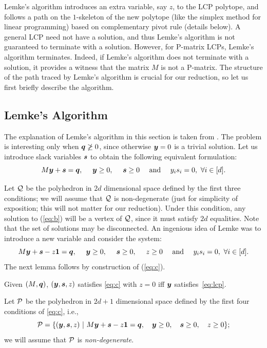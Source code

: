 Lemke's algorithm introduces an extra variable, say $z$, to the LCP polytope,
and follows a path on the $1$-skeleton of the new polytope (like the simplex 
method for linear programming) based
on complementary pivot rule (details below).  A general LCP need not have a
solution, and thus Lemke's algorithm is not guaranteed to terminate with a
solution.  However, for P-matrix LCPs, Lemke's algorithm terminates.  Indeed, if
Lemke's algorithm does not terminate with a solution, it provides a witness that
the matrix $M$ is not a P-matrix.  The structure of the path traced by Lemke's
algorithm is crucial for our reduction, so let us first briefly describe the
algorithm.

\subsection{Lemke's Algorithm}
\label{sec:lemke}

The explanation of Lemke's algorithm in this section is taken from \cite{GMSV}.
The problem is interesting only when $\mbox{\boldmath $q$} \not \geq 0$, since otherwise $\mbox{\boldmath $y$} = 0$ is a trivial solution. Let us introduce
slack variables $\mbox{\boldmath $s$}$ to obtain the following equivalent formulation:
\begin{equation} \label{eq:b} \MM \yy  + \ps = \pq, \ \ \ \  \yy \geq 0, \ \ \ \ \ps \geq 0 \ \ \ \ \mbox{and} \ \ \ \ y_is_i = 0,\ \forall i\in[d].  \end{equation}

Let $\mbox{${\mathcal Q}$}$ be the polyhedron in $2d$ dimensional space defined by the first three conditions; we will assume that $\mbox{${\mathcal Q}$}$ is
non-degenerate (just for simplicity of exposition; this will not matter for our reduction).  
Under this condition, any solution to (\ref{eq:b}) will be a vertex of $\mbox{${\mathcal Q}$}$, since it must satisfy $2d$
equalities. Note that the set of solutions may be disconnected.
%
An ingenious idea of Lemke was to introduce a new variable and consider the system:
\begin{equation} \label{eq:c} \mbox{$M$} \mbox{\boldmath $y$}  + \mbox{\boldmath $s$} -z \mbox{\boldmath $1$}  = \mbox{\boldmath $q$}, \ \ \ \  \mbox{\boldmath $y$} \geq 0, \ \ \ \ \mbox{\boldmath $s$} \geq 0, \ \ \ \  z \geq 0  \ \
\ \ \mbox{and} \ \ \ \ y_is_i = 0,\ \forall i\in[d].  \end{equation}
The next lemma follows by construction of (\ref{eq:c}).
\begin{lemma}\label{lem:lemke1}
Given $(\mbox{$M$},\mbox{\boldmath $q$})$, $(\mbox{\boldmath $y$},\mbox{\boldmath $s$},z)$ satisfies \eqref{eq:c} with $z=0$ iff $\mbox{\boldmath $y$}$ satisfies~\eqref{eq:lcp}.
\end{lemma}
%
Let $\mbox{${\mathcal P}$}$ be the polyhedron in $2d + 1$ dimensional space defined by the first four conditions of \eqref{eq:c}, i.e.,
\begin{equation}\label{eq:cp}
\mbox{${\mathcal P}$} = \{ (\mbox{\boldmath $y$},\mbox{\boldmath $s$}, z) \ |\ \mbox{$M$} \mbox{\boldmath $y$}  + \mbox{\boldmath $s$} -z \mbox{\boldmath $1$}  = \mbox{\boldmath $q$}, \ \ \ \mbox{\boldmath $y$} \geq 0, \ \ \ \mbox{\boldmath $s$} \geq 0, \ \ \  z \geq 0\};
\end{equation}
we will assume that $\mbox{${\mathcal P}$}$ is {\em non-degenerate}.  

